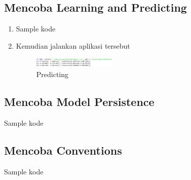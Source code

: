 	\subsection{Mencoba Learning and Predicting}
	\begin{enumerate}
		\item Sample kode \break 
		\item Kemudian jalankan aplikasi tersebut \break
		\begin{figure}[H]
			\includegraphics[width=4cm]{figures/1174043/chapter1/hasil_sample3.png}
			\centering
			\caption{Predicting}
		\end{figure}
	\end{enumerate}
	\subsection{Mencoba Model Persistence}
	Sample kode \break 
	
	\subsection{Mencoba Conventions}
	Sample kode \break 